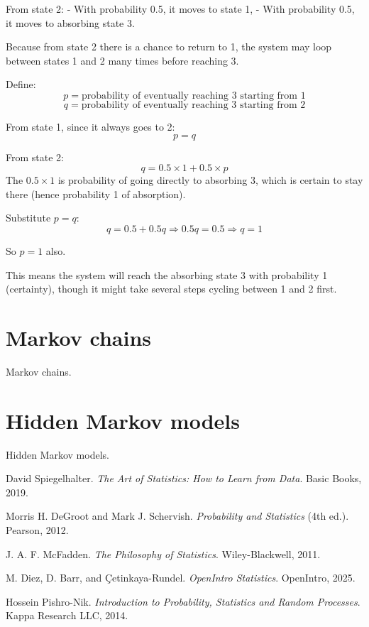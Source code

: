 \documentclass{book}
\begin{document}
From state 2:
- With probability 0.5, it moves to state 1,
- With probability 0.5, it moves to absorbing state 3.

Because from state 2 there is a chance to return to 1, the system may loop between states 1 and 2 many times before reaching 3.

Define:
\[
p = \text{probability of eventually reaching 3 starting from 1}
\]
\[
q = \text{probability of eventually reaching 3 starting from 2}
\]

From state 1, since it always goes to 2:
\[
p = q
\]

From state 2:
\[
q = 0.5 \times 1 + 0.5 \times p
\]
The $0.5 \times 1$ is probability of going directly to absorbing 3, which is certain to stay there (hence probability 1 of absorption).

Substitute $p = q$:
\[
q = 0.5 + 0.5 q
\Rightarrow 0.5 q = 0.5
\Rightarrow q = 1
\]

So $p = 1$ also.

This means the system will reach the absorbing state 3 with probability 1 (certainty), though it might take several steps cycling between 1 and 2 first.

\newpage

\section{Markov chains}
Markov chains.

\newpage

\section{Hidden Markov models}
Hidden Markov models.


\backmatter
 
\begin{thebibliography}{999}

David Spiegelhalter. 
\textit{The Art of Statistics: How to Learn from Data}. 
Basic Books, 2019.

Morris H. DeGroot and Mark J. Schervish.
\textit{Probability and Statistics} (4th ed.).
Pearson, 2012.

J. A. F. McFadden.
\textit{The Philosophy of Statistics}.
Wiley-Blackwell, 2011.

M. Diez, D. Barr, and Çetinkaya-Rundel.
\textit{OpenIntro Statistics}.
OpenIntro, 2025.

Hossein Pishro-Nik.
\textit{Introduction to Probability, Statistics and Random Processes}.
Kappa Research LLC, 2014.

\end{thebibliography}
\end{document}
